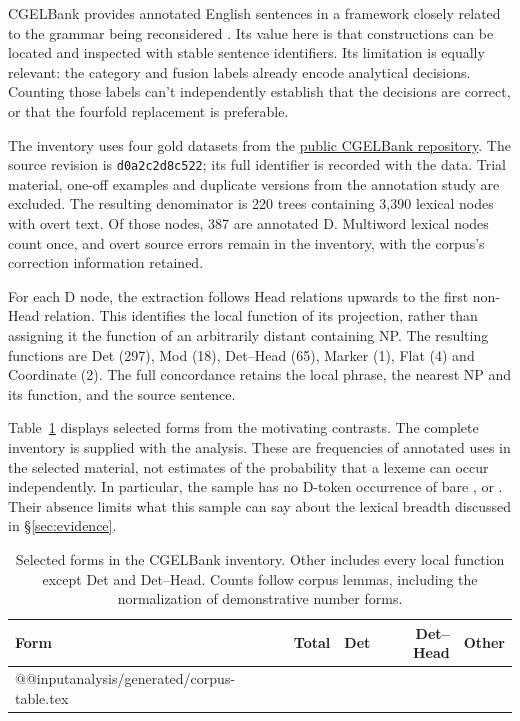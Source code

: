 \documentclass[12pt]{article}
\makeatletter
\newcommand{\tablebody}[1]{\csname @@input\endcsname #1 }
\makeatother
\begin{document}
CGELBank provides annotated English sentences in a framework closely related to the grammar being reconsidered \citep{reynolds2023unified}. Its value here is that constructions can be located and inspected with stable sentence identifiers. Its limitation is equally relevant: the category and fusion labels already encode analytical decisions. Counting those labels can't independently establish that the decisions are correct, or that the fourfold replacement is preferable.

The inventory uses four gold datasets from the \href{https://github.com/nert-nlp/cgel}{public CGELBank repository}. The source revision is \texttt{d0a2c2d8c522}; its full identifier is recorded with the data. Trial material, one-off examples and duplicate versions from the annotation study are excluded. The resulting denominator is 220 trees containing 3,390 lexical nodes with overt text. Of those nodes, 387 are annotated D. Multiword lexical nodes count once, and overt source errors remain in the inventory, with the corpus's correction information retained.

For each D node, the extraction follows Head relations upwards to the first non-Head relation. This identifies the local function of its projection, rather than assigning it the function of an arbitrarily distant containing NP. The resulting functions are Det (297), Mod (18), Det--Head (65), Marker (1), Flat (4) and Coordinate (2). The full concordance retains the local phrase, the nearest NP and its function, and the source sentence.

Table~\ref{tab:corpus} displays selected forms from the motivating contrasts. The complete inventory is supplied with the analysis. These are frequencies of annotated uses in the selected material, not estimates of the probability that a lexeme can occur independently. In particular, the sample has no D-token occurrence of bare ,  or . Their absence limits what this sample can say about the lexical breadth discussed in §\ref{sec:evidence}.

\begin{table}[tb]
\centering\small
\caption{Selected forms in the CGELBank inventory. Other includes every local function except Det and Det--Head. Counts follow corpus lemmas, including the normalization of demonstrative number forms.}\label{tab:corpus}
\begin{tabular}{lrrrr}
\toprule
Form & Total & Det & Det--Head & Other \\
\midrule
\tablebody{analysis/generated/corpus-table.tex}
\bottomrule
\end{tabular}
\end{table}
\end{document}
